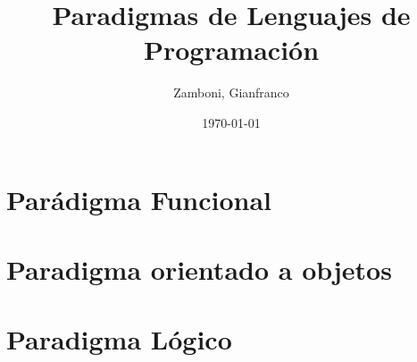 \documentclass[10pt,a4paper]{article}
\begin{document}
\title{Paradigmas de Lenguajes de Programación}

\date{\today}

\author{Zamboni, Gianfranco}
\begin{titlepage}
    \maketitle
    \thispagestyle{empty}
    \tableofcontents
\end{titlepage}

\newpage
\setcounter{page}{1}


\newpage
\part{Parádigma Funcional}



\newpage


\newpage


\newpage


\newpage
\part{Paradigma orientado a objetos}


\newpage


\newpage


\newpage
\part{Paradigma Lógico}



\newpage


\newpage

\appendix
\newpage

\end{document}
